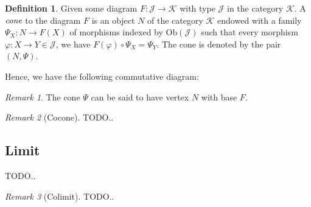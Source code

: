 \documentclass[10pt, oneside, reqno]{amsart}
\theoremstyle{plain}%
\theoremstyle{definition}
\newtheorem{defn}[thm]{Definition}
\theoremstyle{remark}
\newtheorem*{rem}{Remark}
\begin{document}
\begin{defn}
 Given some diagram $F: \mathcal{J} \to \mathcal{K}$ with type $\mathcal{J}$ in the category $\mathcal{K}$.
 A $\emph{cone}$ to the diagram $F$ is an object $N$ of the category $\mathcal{K}$ endowed with a family $\Psi_{X}: N \to F(X)$ of morphisms
 indexed by $\text{Ob}(\mathcal{J})$ such that every morphism $\varphi: X \to Y \in \mathcal{J}$, we have $F(\varphi) \circ \Psi_{X} = \Psi_{Y}$.
 The cone is denoted by the pair $(N, \Psi)$.
\end{defn}

Hence, we have the following commutative diagram:

\begin{rem}
 The cone $\Psi$ can be said to have vertex $N$ with base $F$.
\end{rem}

\begin{rem}[Cocone]
 TODO..
\end{rem}

\subsection{Limit} %
\label{subsec:limit}
TODO..

\begin{rem}[Colimit]
 TODO..
\end{rem}
\end{document}
